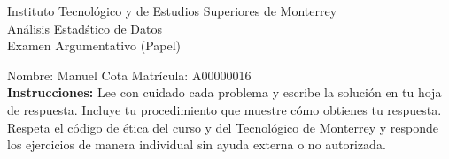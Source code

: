 \documentclass[10pt]{report}
\begin{document}
\newpage



\begin{center}
{\large Instituto Tecnol\'{o}gico y de Estudios Superiores de Monterrey \\
An\'alisis Estad\'stico de Datos } \\
Examen Argumentativo (Papel)
\end{center}

Nombre: \underline{\hspace*{.2in}}
Manuel Cota
\underline{\hspace*{.2in}} \quad Matr\'icula:\underline{\hspace*{.2in}}
A00000016
\underline{\hspace*{.2in}} \\

{\bf Instrucciones:} Lee con cuidado cada problema y escribe la soluci\'on
en tu hoja de respuesta. Incluye tu procedimiento que muestre c\'omo obtienes tu respuesta.  Respeta el c\'odigo de \'etica del curso y del Tecnol\'ogico de Monterrey y responde los ejercicios de manera individual sin ayuda externa o no autorizada.
\end{document}
